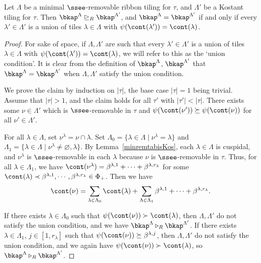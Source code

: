 \begin{lemma}\label{othersmaller}
Let \(\Lambda\) be a minimal \(\ssee\)-removable ribbon tiling for \(\tau\), and \(\Lambda'\) be a Kostant tiling for \(\tau\). Then \(\bkap^\Lambda \trianglerighteq_R \bkap^{\Lambda'}\), and \(\bkap^\Lambda = \bkap^{\Lambda'}\) if and only if every \(\lambda' \in \Lambda'\) is a union of tiles \(\lambda \in \Lambda\) with \(\psi(\cont(\lambda')) = \cont(\lambda)\).
\end{lemma}
\begin{proof}
For sake of space, if \(\Lambda, \Lambda'\) are such that every \(\lambda' \in \Lambda'\) is a union of tiles \(\lambda \in \Lambda\) with \(\psi(\cont(\lambda')) = \cont(\lambda)\), we will refer to this as the `union condition'. It is clear from the definition of \(\bkap^\Lambda\), \(\bkap^{\Lambda'}\) that \(\bkap^\Lambda = \bkap^{\Lambda'}\) when \(\Lambda, \Lambda'\) satisfy the union condition.

We prove the claim by induction on \(|\tau|\), the base case \(|\tau| = 1\) being trivial. Assume that \(|\tau| >1\), and the claim holds for all \(\tau'\) with \(|\tau'| < |\tau|\). There exists some \(\nu \in \Lambda'\) which is \(\ssee\)-removable in \(\tau\) and \(\psi(\cont(\nu')) \succeq \psi(\cont(\nu))\) for all \(\nu' \in \Lambda'\).

For all \(\lambda \in \Lambda\), set \(\nu^\lambda = \nu \cap \lambda\). Set \(\Lambda_0 = \{\lambda \in \Lambda \mid \nu^\lambda = \lambda\}\) and \(\Lambda_1 = \{\lambda \in \Lambda \mid \nu^\lambda \neq \varnothing, \lambda\}\).
By Lemma~\ref{minremtabisKos}, each \(\lambda \in \Lambda\) is cuspidal, and \(\nu^\lambda\) is \(\ssee\)-removable in each \(\lambda\) because \(\nu\) is \(\ssee\)-removable in \(\tau\). Thus, for all \(\lambda \in \Lambda_1\), we have
 \(
\cont(\nu^\lambda) = \beta^{\lambda, 1} + \cdots + \beta^{\lambda, r_\lambda}
\)
for some \(\cont(\lambda) \prec \beta^{\lambda, 1}, \cdots, \beta^{\lambda, r_\lambda} \in \Phi_+\). Then we have
\begin{align*}
\cont(\nu) = \sum_{\lambda \in \Lambda_0} \cont(\lambda) + \sum_{\Lambda \in \Lambda_1} \beta^{\lambda, 1} + \cdots + \beta^{\lambda, r_{\lambda}}.
\end{align*}

If there exists \(\lambda \in \Lambda_0\) such that \(\psi(\cont(\nu)) \succ \cont(\lambda)\), then \(\Lambda, \Lambda'\) do not satisfy the union condition, and we have \(\bkap^\Lambda \triangleright_R \bkap^{\Lambda'}\). If there exists \(\lambda \in \Lambda_1\), \(j \in [1, r_\lambda]\) such that \(\psi(\cont(\nu)) \succeq \beta^{\lambda, j}\), then \(\Lambda, \Lambda'\) do not satisfy the union condition, and we again have \(\psi(\cont(\nu)) \succ \cont(\lambda)\), so \(\bkap^\Lambda \triangleright_R \bkap^{\Lambda'}\). 


\end{proof}
